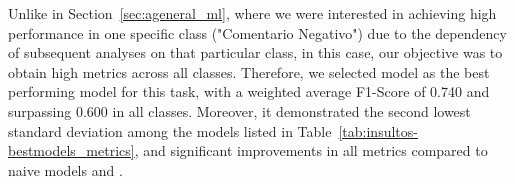 \begin{table}[H]
    \centering
    \begingroup
    \small %
    \endgroup
\end{table}

\newpage

Unlike in Section~\ref{sec:ageneral_ml}, where we were interested in achieving high performance in one specific class ("Comentario Negativo") due to the dependency of subsequent analyses on that particular class, in this case, our objective was to obtain high metrics across all classes. Therefore, we selected model \textbf{\insmlptea} as the best performing model for this task, with a weighted average F1-Score of 0.740 and surpassing 0.600 in all classes. Moreover, it demonstrated the second lowest standard deviation among the models listed in Table~\ref{tab:insultos-bestmodels_metrics}, and significant improvements in all metrics compared to naive models {\insmajor} and {\insrandom}.

